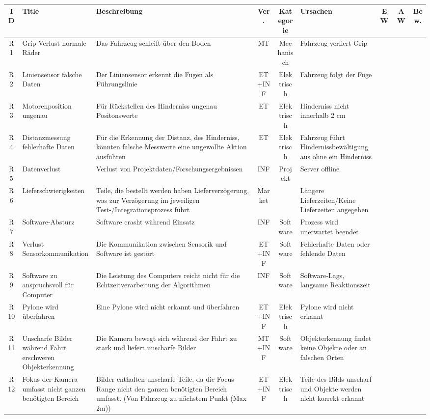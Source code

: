 \begin{landscape}
\scriptsize
\begin{longtable}{|c|p{4cm}|p{7cm}|c|c|p{4cm}|c|c|c|}
\hline
ID & Title & Beschreibung & Ver. & Kategorie & Ursachen & EW & AW & Bew.  \\
\hline
R1 & Grip-Verlust normale Räder & Das Fahrzeug schleift über den Boden & MT & Mechanisch & Fahrzeug verliert Grip \\
\hline
R2 & Liniensensor falsche Daten & Der Liniensensor erkennt die Fugen als Führungslinie & ET+INF & Elektrisch & Fahrzeug folgt der Fuge \\
R3 & Motorenposition ungenau & Für Rückstellen des Hinderniss ungenau Positonswerte & ET & Elektrisch & Hinderniss nicht innerhalb 2 cm \\
\hline
R4 & Distanzmessung fehlerhafte Daten & Für die Erkennung der Distanz, des Hinderniss, könnten falsche Messwerte eine ungewollte Aktion ausführen & ET & Elektrisch & Fahrzeug führt Hindernissbewältigung aus ohne ein Hinderniss \\
\hline
R5 & Datenverlust & Verlust von Projektdaten/Forschungsergebnissen & INF & Projekt & Server offline \\
\hline
R6 & Lieferschwierigkeiten & Teile, die bestellt werden haben Lieferverzögerung, was zur Verzögerung im jeweiligen Test-/Integrationsprozess führt & Market & & Längere Lieferzeiten/Keine Lieferzeiten angegeben \\
\hline
R7 & Software-Absturz & Software crasht während Einsatz & INF & Software & Prozess wird unerwartet beendet \\
\hline
R8 & Verlust Sensorkommunikation & Die Kommunikation zwischen Sensorik und Software ist gestört & ET+INF & Software & Fehlerhafte Daten oder fehlende Daten \\
\hline
R9 & Software zu anspruchsvoll für Computer & Die Leistung des Computers reicht nicht für die Echtzeitverarbeitung der Algorithmen & INF & Software & Software-Lags, langsame Reaktionszeit \\
\hline
R10 & Pylone wird überfahren & Eine Pylone wird nicht erkannt und überfahren & ET+INF & Elektrisch & Pylone wird nicht erkannt \\
\hline
R11 & Unscharfe Bilder während Fahrt erschweren Objekterkennung & Die Kamera bewegt sich während der Fahrt zu stark und liefert unscharfe Bilder & MT+INF & Software & Objekterkennung findet keine Objekte oder an falschen Orten \\
\hline
R12 & Fokus der Kamera umfasst nicht ganzen benötigten Bereich & Bilder enthalten unscharfe Teile, da die Focus Range nicht den ganzen benötigten Bereich umfasst. (Von Fahrzeug zu nächstem Punkt (Max 2m)) & ET+INF & Elektrisch & Teile des Bilds unscharf und Objekte werden nicht korrekt erkannt \\

\end{longtable}
\end{landscape}
